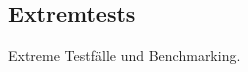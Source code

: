 %



\newpage



\label{Abschnitt:Tests:Protokoll:Extrem}



\subsection*{Extremtests}

Extreme Testfälle und Benchmarking.






